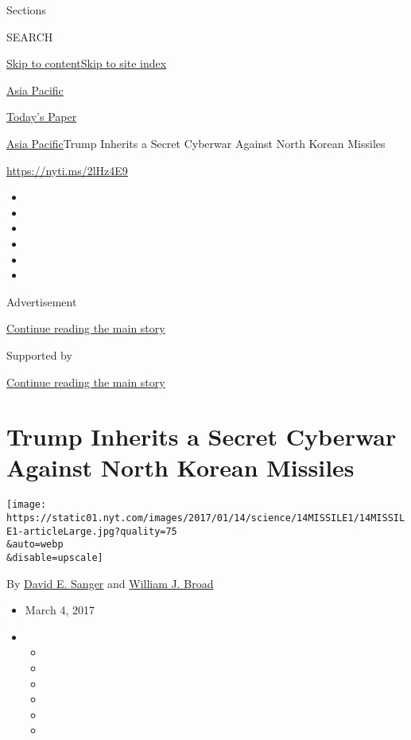 Sections

SEARCH

\protect\hyperlink{site-content}{Skip to
content}\protect\hyperlink{site-index}{Skip to site index}

\href{https://www.nytimes.com/section/world/asia}{Asia Pacific}

\href{https://myaccount.nytimes.com/auth/login?response_type=cookie\&client_id=vi}{}

\href{https://www.nytimes.com/section/todayspaper}{Today's Paper}

\href{/section/world/asia}{Asia Pacific}\textbar{}Trump Inherits a
Secret Cyberwar Against North Korean Missiles

\url{https://nyti.ms/2lHz4E9}

\begin{itemize}
\item
\item
\item
\item
\item
\item
\end{itemize}

Advertisement

\protect\hyperlink{after-top}{Continue reading the main story}

Supported by

\protect\hyperlink{after-sponsor}{Continue reading the main story}

\hypertarget{trump-inherits-a-secret-cyberwar-against-north-korean-missiles}{%
\section{Trump Inherits a Secret Cyberwar Against North Korean
Missiles}\label{trump-inherits-a-secret-cyberwar-against-north-korean-missiles}}

\texttt{[image: https://static01.nyt.com/images/2017/01/14/science/14MISSILE1/14MISSILE1-articleLarge.jpg?quality=75\\\&auto=webp\\\&disable=upscale]}

By \href{http://www.nytimes.com/by/david-e-sanger}{David E. Sanger} and
\href{http://www.nytimes.com/by/william-j-broad}{William J. Broad}

\begin{itemize}
\item
  March 4, 2017
\item
  \begin{itemize}
  \item
  \item
  \item
  \item
  \item
  \item
  \end{itemize}
\end{itemize}

